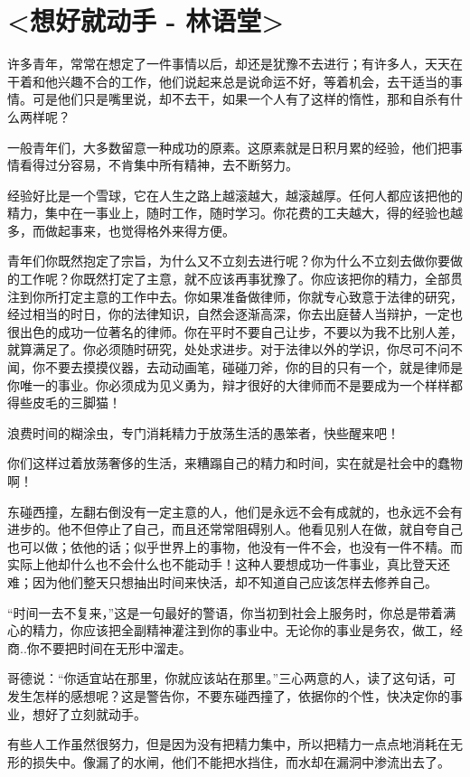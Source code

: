 \documentclass[UTF8,a4paper,8pt]{ctexart}
\begin{document}
	\section{<想好就动手 - 林语堂>}	
		许多青年，常常在想定了一件事情以后，却还是犹豫不去进行；有许多人，天天在干着和他兴趣不合的工作，他们说起来总是说命运不好，等着机会，去干适当的事情。可是他们只是嘴里说，却不去干，如果一个人有了这样的惰性，那和自杀有什么两样呢？
		
		
		一般青年们，大多数留意一种成功的原素。这原素就是日积月累的经验，他们把事情看得过分容易，不肯集中所有精神，去不断努力。
		
		
		经验好比是一个雪球，它在人生之路上越滚越大，越滚越厚。任何人都应该把他的精力，集中在一事业上，随时工作，随时学习。你花费的工夫越大，得的经验也越多，而做起事来，也觉得格外来得方便。
		
		
		青年们你既然抱定了宗旨，为什么又不立刻去进行呢？你为什么不立刻去做你要做的工作呢？你既然打定了主意，就不应该再事犹豫了。你应该把你的精力，全部贯注到你所打定主意的工作中去。你如果准备做律师，你就专心致意于法律的研究，经过相当的时日，你的法律知识，自然会逐渐高深，你去出庭替人当辩护，一定也很出色的成功一位著名的律师。你在平时不要自己让步，不要以为我不比别人差，就算满足了。你必须随时研究，处处求进步。对于法律以外的学识，你尽可不问不闻，你不要去摸摸仪器，去动动画笔，碰碰刀斧，你的目的只有一个，就是律师是你唯一的事业。你必须成为见义勇为，辩才很好的大律师而不是要成为一个样样都得些皮毛的三脚猫！
		
		
		浪费时间的糊涂虫，专门消耗精力于放荡生活的愚笨者，快些醒来吧！
		
		
		你们这样过着放荡奢侈的生活，来糟蹋自己的精力和时间，实在就是社会中的蠢物啊！
		
		
		东碰西撞，左翻右倒没有一定主意的人，他们是永远不会有成就的，也永远不会有进步的。他不但停止了自己，而且还常常阻碍别人。他看见别人在做，就自夸自己也可以做；依他的话；似乎世界上的事物，他没有一件不会，也没有一件不精。而实际上他却什么也不会什么也不能动手！这种人要想成功一件事业，真比登天还难；因为他们整天只想抽出时间来快活，却不知道自己应该怎样去修养自己。
		
		
		“时间一去不复来，”这是一句最好的警语，你当初到社会上服务时，你总是带着满心的精力，你应该把全副精神灌注到你的事业中。无论你的事业是务农，做工，经商..你不要把时间在无形中溜走。
		
		
		哥德说：“你适宜站在那里，你就应该站在那里。”三心两意的人，读了这句话，可发生怎样的感想呢？这是警告你，不要东碰西撞了，依据你的个性，快决定你的事业，想好了立刻就动手。
		
		
		有些人工作虽然很努力，但是因为没有把精力集中，所以把精力一点点地消耗在无形的损失中。像漏了的水闸，他们不能把水挡住，而水却在漏洞中渗流出去了。
\end{document}
